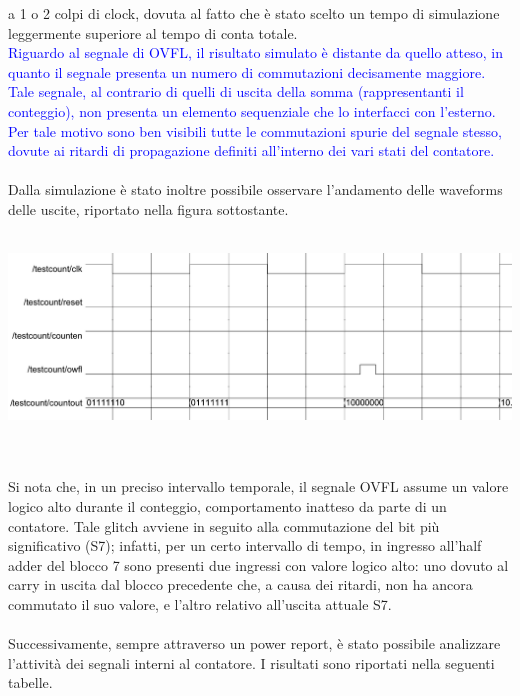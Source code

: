 \documentclass[11pt,  english, makeidx, a4paper, titlepage, oneside]{book}
\begin{document}
a 1 o 2 colpi di clock, dovuta al fatto che è stato scelto un 
tempo di simulazione leggermente superiore al tempo di conta 
totale.
\\
\textcolor{blue}{Riguardo al segnale di OVFL, il risultato simulato
è distante da quello atteso, in quanto il segnale presenta un numero di commutazioni
decisamente maggiore. Tale segnale, al contrario di quelli di uscita della somma (rappresentanti il conteggio), non 
presenta un elemento sequenziale che lo interfacci con l'esterno. Per tale motivo
sono ben visibili tutte le commutazioni spurie del segnale stesso, dovute ai ritardi
di propagazione definiti all'interno dei vari stati del contatore.}
\\\\
Dalla simulazione è stato inoltre possibile osservare l'andamento 
delle waveforms delle uscite, riportato nella figura sottostante.
\\\\
\centerline{\includegraphics[width=15cm]{./img/Lab_1/Es_5/Glitch.png}}
\\\\
Si nota che, in
un preciso intervallo temporale, il segnale OVFL assume un valore 
logico alto durante il conteggio, comportamento inatteso da parte
di un contatore. 
Tale glitch avviene in seguito alla commutazione
del bit più significativo (S7); infatti, per un certo intervallo di tempo,
in ingresso all'half adder del blocco 7 sono presenti due ingressi con valore
logico alto: uno dovuto al carry in uscita dal blocco precedente che, a causa
dei ritardi, non ha ancora commutato il suo valore, e l'altro relativo all'uscita
attuale S7.
\\\\
Successivamente, sempre attraverso un power report, è stato possibile
analizzare l'attività dei segnali interni al contatore. I risultati sono 
riportati nella seguenti tabelle.
\\
\end{document}

